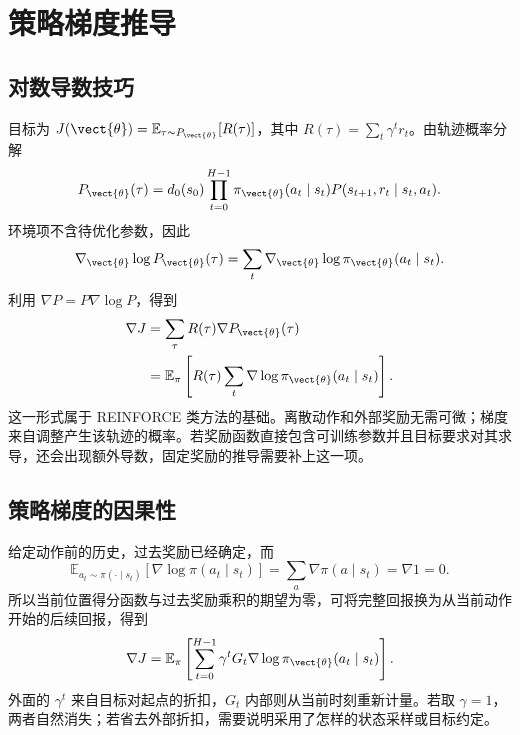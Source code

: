\documentclass[../textbook.tex]{subfiles}
\begin{document}
\section{策略梯度推导}

\subsection{对数导数技巧}
目标为 $J(\vect{\theta})=\mathbb E_{\tau\sim P_{\vect{\theta}}}[R(\tau)]$，其中 $R(\tau)=\sum_t\gamma^tr_t$。由轨迹概率分解
\begin{equation}
 P_{\vect{\theta}}(\tau)=d_0(s_0)\prod_{t=0}^{H-1}\pi_{\vect{\theta}}(a_t\mid s_t)P(s_{t+1},r_t\mid s_t,a_t).
\end{equation}
环境项不含待优化参数，因此
\begin{equation}
 \nabla_{\vect{\theta}}\log P_{\vect{\theta}}(\tau)=\sum_t\nabla_{\vect{\theta}}\log\pi_{\vect{\theta}}(a_t\mid s_t).
\end{equation}
利用 $\nabla P=P\nabla\log P$，得到
\begin{align}
 \nabla J&=\sum_\tau R(\tau)\nabla P_{\vect{\theta}}(\tau)\\
 &=\mathbb E_\pi\left[R(\tau)\sum_t\nabla\log\pi_{\vect{\theta}}(a_t\mid s_t)\right].
 \label{eq:rl-score}
\end{align}
这一形式属于 REINFORCE 类方法的基础\cite{williams1992reinforce}。离散动作和外部奖励无需可微；梯度来自调整产生该轨迹的概率。若奖励函数直接包含可训练参数并且目标要求对其求导，还会出现额外导数，固定奖励的推导需要补上这一项。

\subsection{策略梯度的因果性}
给定动作前的历史，过去奖励已经确定，而
\begin{equation}
 \mathbb E_{a_t\sim\pi(\cdot\mid s_t)}[\nabla\log\pi(a_t\mid s_t)]
 =\sum_a\nabla\pi(a\mid s_t)=\nabla1=0.
\end{equation}
所以当前位置得分函数与过去奖励乘积的期望为零，可将完整回报换为从当前动作开始的后续回报，得到
\begin{equation}
 \nabla J=\mathbb E_\pi\left[\sum_{t=0}^{H-1}\gamma^tG_t\nabla\log\pi_{\vect{\theta}}(a_t\mid s_t)\right].
 \label{eq:rl-causal-gradient}
\end{equation}
外面的 $\gamma^t$ 来自目标对起点的折扣，$G_t$ 内部则从当前时刻重新计量。若取 $\gamma=1$，两者自然消失；若省去外部折扣，需要说明采用了怎样的状态采样或目标约定。
\end{document}
